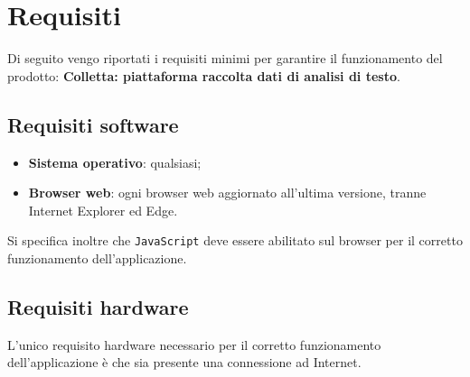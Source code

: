 \section{Requisiti}

    Di seguito vengo riportati i requisiti minimi per garantire il funzionamento del prodotto: 
\textbf{Colletta: piattaforma raccolta dati di analisi di testo}. 


\subsection{Requisiti software}
\begin{itemize}
\item \textbf{Sistema operativo}: qualsiasi;
\item \textbf{Browser web}: ogni browser web aggiornato all'ultima versione, tranne Internet Explorer ed Edge.
\end{itemize}
Si specifica inoltre che \texttt{JavaScript} deve essere abilitato sul browser per il corretto funzionamento dell'applicazione.

\subsection{Requisiti hardware}
L'unico requisito hardware necessario per il corretto funzionamento dell'applicazione è che sia presente una connessione ad Internet. 
\newpage
